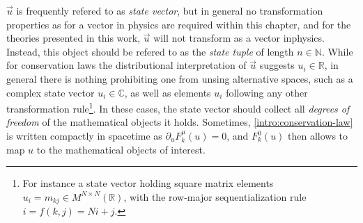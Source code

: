 $\vec u$ is frequently refered to as \emph{state vector}, but in general no
transformation properties as for a vector in physics are required within
this chapter, and for the theories presented in this work, $\vec u$ will not
transform as a vector inphysics. Instead, this object should be
refered to as the \emph{state tuple} of length $n\in\mathbb N$. While for
conservation
laws the distributional interpretation of $\vec u$ suggests $u_i\in\mathbb R$,
in general there is nothing prohibiting one from unsing alternative spaces,
such as a complex state vector $u_i \in \mathbb C$, as well as elements $u_i$ 
following any other transformation rule\footnote{
	For instance a state vector holding square matrix elements
	$u_i = m_{kj} \in M^{N\times N}(\mathbb R)$,
	with the row-major sequentialization rule $i=f(k,j)=Ni+j$.
}. In these cases, the state vector should collect all \emph{degrees of freedom}
of the mathematical objects it holds. Sometimes, \eqref{intro:conservation-law}
is written compactly in spacetime as $\partial_u F^\mu_k(u)=0$, and $F^0_k(u)$
then allows to map $u$ to the mathematical objects of interest.

